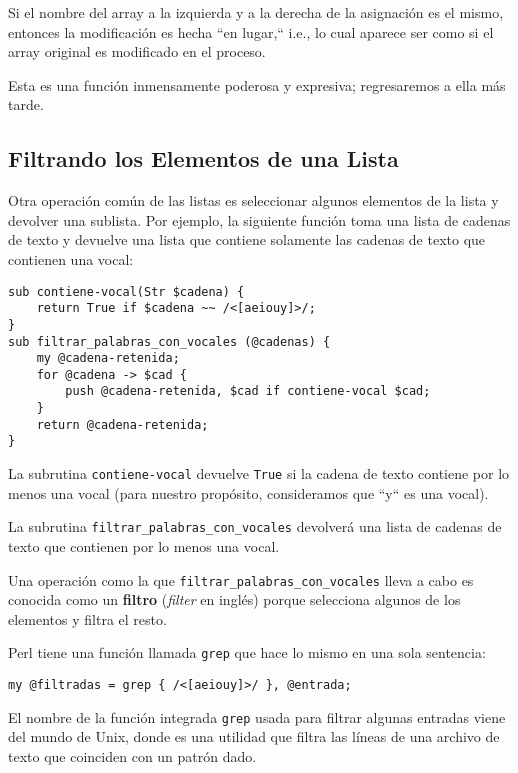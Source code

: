 Si el nombre del array a la izquierda y a la derecha de la 
asignación es el mismo, entonces la modificación es hecha
``en lugar,`` i.e., lo cual aparece ser como si el array original
es modificado en el proceso.

Esta es una función inmensamente poderosa y expresiva; regresaremos
a ella más tarde.

\subsection{Filtrando los Elementos de una Lista}

Otra operación común de las listas es seleccionar algunos elementos
de la lista y devolver una sublista. Por ejemplo, la siguiente
función toma una lista de cadenas de texto y devuelve una lista
que contiene solamente las cadenas de texto que contienen
una vocal:

\begin{lstlisting}
sub contiene-vocal(Str $cadena) {
    return True if $cadena ~~ /<[aeiouy]>/;
}
sub filtrar_palabras_con_vocales (@cadenas) {
    my @cadena-retenida;
    for @cadena -> $cad { 
        push @cadena-retenida, $cad if contiene-vocal $cad;
    }
    return @cadena-retenida;
}  
\end{lstlisting}
%

La subrutina {\tt contiene-vocal} devuelve {\tt True} si 
la cadena de texto contiene por lo menos una vocal (para 
nuestro propósito, consideramos que ``y`` es una vocal).

La subrutina \verb|filtrar_palabras_con_vocales| devolverá 
una lista de cadenas de texto que contienen por lo menos
una vocal.

Una operación como la que \verb|filtrar_palabras_con_vocales| lleva
a cabo es conocida como un {\bf filtro} (\emph{filter} en inglés) 
porque selecciona algunos de los elementos y filtra el resto.

Perl tiene una función llamada {\tt grep} que hace lo mismo
en una sola sentencia:

\begin{lstlisting}
my @filtradas = grep { /<[aeiouy]>/ }, @entrada;
\end{lstlisting}
%

El nombre de la función integrada {\tt grep} usada
para filtrar algunas entradas viene del mundo de Unix,
donde es una utilidad que filtra las líneas de una archivo
de texto que coinciden con un patrón dado. 

